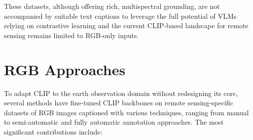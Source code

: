\documentclass[a4paper, twoside, english]{sapthesis} %
\begin{document}
These datasets, although offering rich, multispectral grounding, are not accompanied by suitable text captions to leverage the full potential of VLMs relying on contrastive learning and the current CLIP-based landscape for remote sensing remains limited to RGB-only inputs.


\section{RGB Approaches}

To adapt CLIP to the earth observation domain without redesigning its core, several methods have fine-tuned CLIP backbones on remote sensing-specific datasets of RGB images captioned with various techniques, ranging from manual to semi-automatic and fully automatic annotation approaches. The most significant contributions include:
\end{document}
